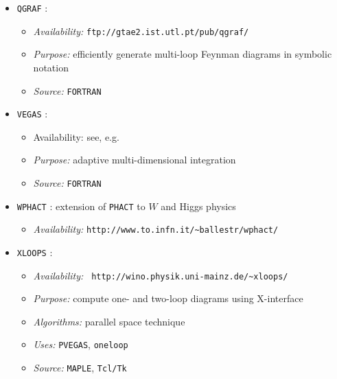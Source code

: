 \begin{itemize}

\item {\tt QGRAF} \cite{Nog93}:
  \begin{itemize}
  \item{\it Availability:} {\tt ftp://gtae2.ist.utl.pt/pub/qgraf/}
  \item{\it Purpose:} efficiently generate multi-loop Feynman diagrams in
    symbolic notation
  \item{\it Source:} {\tt FORTRAN}
  \end{itemize}


\item{\tt VEGAS} \cite{VEGAS}:
  \begin{itemize}
  \item{Availability:} see, e.g.~\cite{NumRecBook}
  \item{\it Purpose:} adaptive multi-dimensional integration
  \item{\it Source:} {\tt FORTRAN}
  \end{itemize}
  

\item {\tt WPHACT} \cite{wphact}: extension of {\tt PHACT} to $W$ and
  Higgs physics
  \begin{itemize}
  \item {\it Availability:}
    {\tt http://www.to.infn.it/\~\/ballestr/wphact/}
  \end{itemize}


\item {\tt XLOOPS} \cite{XLOOPS}:
  \begin{itemize}
  \item{\it Availability:} {\tt
      http://wino.physik.uni-mainz.de/\~\/xloops/}
  \item{\it Purpose:} compute one- and two-loop diagrams using
    X-interface
  \item{\it Algorithms:} parallel space technique \cite{CzaKilKre95}
  \item{\it Uses:} {\tt PVEGAS}, {\tt oneloop}
  \item{\it Source:} {\tt MAPLE}, {\tt Tcl/Tk}
  \end{itemize}
\end{itemize}



\setlength{\baselineskip}{\savebaselineskip}




